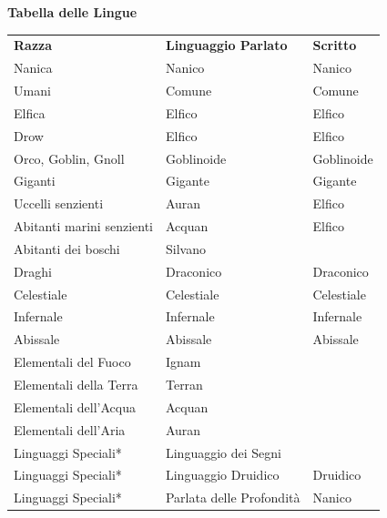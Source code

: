 \documentclass[a4paper,11pt,twoside,openany]{book}
\begin{document}
\bigskip

\textbf{Tabella delle Lingue}

\medskip

\begin{tabular}{lll}
	\toprule
	\textbf{Razza}            & \textbf{Linguaggio Parlato} & \textbf{Scritto}\\
	Nanica                    & Nanico			            & Nanico\\
	Umani                     & Comune                      & Comune\\
	Elfica                    & Elfico                      & Elfico\\
	Drow                      & Elfico			            & Elfico\\
	Orco, Goblin, Gnoll       & Goblinoide                  & Goblinoide\\
	Giganti                   & Gigante                     & Gigante\\
	Uccelli senzienti         & Auran                       & Elfico\\
	Abitanti marini senzienti & Acquan                      & Elfico\\
	Abitanti dei boschi       & Silvano                     & \\
	Draghi                    & Draconico                   & Draconico\\
	Celestiale                & Celestiale                  & Celestiale\\
	Infernale                 & Infernale                   & Infernale\\
	Abissale                  & Abissale                    & Abissale\\
	Elementali del Fuoco      & Ignam                       & \\
	Elementali della Terra    & Terran                      & \\
	Elementali dell'Acqua     & Acquan                      & \\
	Elementali dell'Aria	  & Auran                       & \\
	Linguaggi Speciali*		  & Linguaggio dei Segni        & \\ 
	Linguaggi Speciali*		  & Linguaggio Druidico			& Druidico\\ 
	Linguaggi Speciali*		  & Parlata delle Profondità    & Nanico\\ 

\end{tabular}
\end{document}
